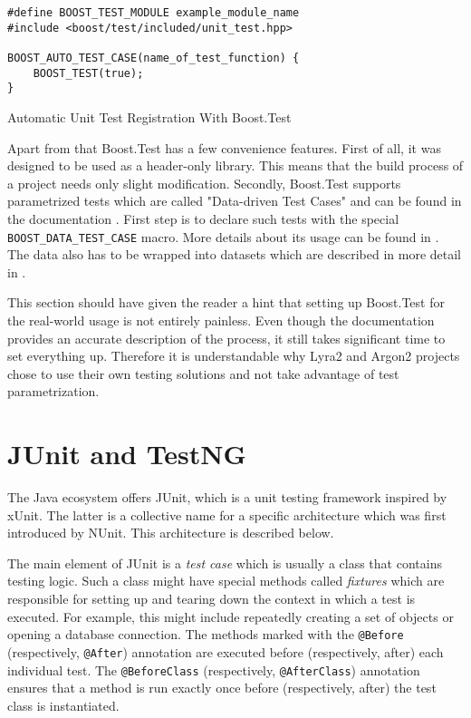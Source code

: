 \begin{listing}
\centering
\begin{verbatim}
#define BOOST_TEST_MODULE example_module_name
#include <boost/test/included/unit_test.hpp>

BOOST_AUTO_TEST_CASE(name_of_test_function) {
    BOOST_TEST(true);
}
  \end{verbatim}
  \caption{Automatic Unit Test Registration With Boost.Test}
  \label{fig:boost-auto-test-case}
\end{listing}

Apart from that Boost.Test has a few convenience features. First of all, it was designed to be used as a header-only library. This means that the build process of a project needs only slight modification. Secondly, Boost.Test supports parametrized tests which are called "Data-driven Test Cases" and can be found in the documentation \cite{boost:2017:test-data-driven}. First step is to declare such tests with the special \texttt{BOOST\_DATA\_TEST\_CASE} macro. More details about its usage can be found in \cite{boost:2017:test-docs-data-macro}. The data also has to be wrapped into datasets which are described in more detail in \cite{boost:2017:test-docs-dataset}.

This section should have given the reader a hint that setting up Boost.Test for the real-world usage is not entirely painless. Even though the documentation provides an accurate description of the process, it still takes significant time to set everything up. Therefore it is understandable why Lyra2 and Argon2 projects chose to use their own testing solutions and not take advantage of test parametrization.

\section{JUnit and TestNG}
\label{sec:unit-junit-testng}

The Java ecosystem offers JUnit, which is a unit testing framework inspired by xUnit. The latter is a collective name for a specific architecture which was first introduced by NUnit. This architecture is described below.

The main element of JUnit is a \emph{test case} which is usually a class that contains testing logic. Such a class might have special methods called \emph{fixtures} which are responsible for setting up and tearing down the context in which a test is executed. For example, this might include repeatedly creating a set of objects or opening a database connection. The methods marked with the \texttt{@Before} (respectively, \texttt{@After}) annotation are executed before (respectively, after) each individual test. The \texttt{@BeforeClass} (respectively, \texttt{@AfterClass}) annotation ensures that a method is run exactly once before (respectively, after) the test class is instantiated.

